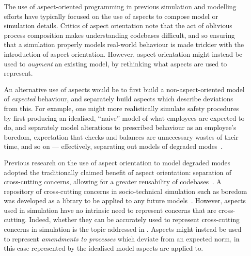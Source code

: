 The use of aspect-oriented programming in previous simulation and modelling
efforts have typically focused on the use of aspects to compose model or
simulation details. Critics of aspect orientation note that the act of oblivious
process composition makes understanding codebases difficult, and so ensuring
that a simulation properly models real-world behaviour is made trickier with the
introduction of aspect orientation.  However, aspect orientation might instead be used
to \emph{augment} an existing model, by rethinking what aspects are used to
represent.

An alternative use of aspects would be to first build a non-aspect-oriented
model of \emph{expected} behaviour, and separately build aspects which describe
deviations from this. For example, one might more realistically simulate safety
procedures by first producing an idealised, ``naive'' model of what employees
are expected to do, and separately model alterations to prescribed behaviour as
an employee's boredom, expectation that checks and balances are unnecessary
wastes of their time, and so on --- effectively, separating out models of
degraded modes~\cite{johnson2007degradedmodes}.

Previous research on the use of aspect orientation to model degraded modes
adopted the traditionally claimed benefit of aspect orientation: separation of
cross-cutting concerns, allowing for a greater reusability of
codebases~\cite{wallis2018caise}. A repository of cross-cutting concerns in
socio-technical simulation such as boredom was developed as a library to be
applied to any future models~\cite{fuzzimoss_repo}. However, aspects used in
simulation have no intrinsic need to represent concerns that are cross-cutting.
Indeed, whether they can be accurately used to represent cross-cutting concerns
in simulation is the topic addressed in . Aspects
might instead be used to represent \emph{amendments to processes} which deviate
from an expected norm, in this case represented by the idealised model aspects
are applied to.

